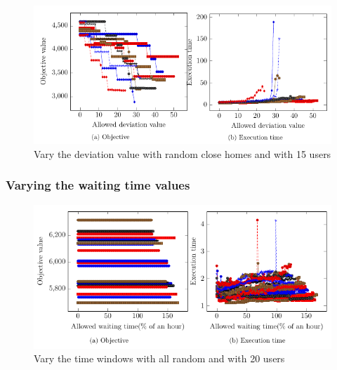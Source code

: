 \documentclass[12pt, a4paper, twoside]{memoir}
\begin{document}
{	\begin{figure}[H]
		\centering
		\begin{flushleft}
			\includegraphics[scale=0.9]{img/compiledResults/10.png}
		\end{flushleft}
		\caption{Vary the deviation value with random close homes and with 15 users}
		\label{fig:Vary the deviation value with random close homes and with 15 users}
	\end{figure}
	
	\subsubsection{Varying the waiting time values}
	\begin{figure}[H]
		\centering
		\begin{flushleft}
			\floatplacement{figure}{t}
			\includegraphics[scale=0.9]{img/compiledResults/0.png}
		\end{flushleft}
		\caption{Vary the time windows with all random and with 20 users}
		\label{fig:Vary the time windows with all random and with 20 users}
	\end{figure}
	
}
\end{document}
